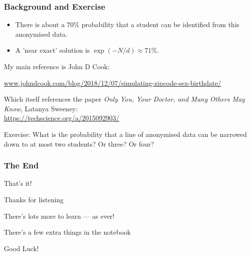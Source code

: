 \documentclass[dvips, %
               xcolor=pst,
               hyperref={colorlinks=false,
               dvips,
               citecolor=magenta,menucolor=cyan,
               bookmarks,bookmarksopen,pdfpagemode=UseThumbs}
              ]{beamer}
\renewcommand{\red}{}
\begin{document}
\begin{frame}[fragile]\frametitle{Background and Exercise}

\begin{itemize}[<+->]

\item There is about a $70\%$ probability that a student can be identified from
this anonymised data.

\item A 'near exact' solution is $\exp(-N/d) \approx 71\%$.

\end{itemize}


My main reference is John D Cook:

\bigskip\pause
{\footnotesize
\url{www.johndcook.com/blog/2018/12/07/simulating-zipcode-sex-birthdate/}}

\bigskip\pause
Which itself references the paper {\red \textit{Only You, Your Doctor, and Many Others May Know},
Latanya Sweeney}:\\
\url{https://techscience.org/a/2015092903/}

\bigskip\pause
\alert{Exercise:} What is the probability that a line of anonymised data can be narrowed down
to at most two students? Or three? Or four?


\end{frame}

\begin{frame}[fragile]\frametitle{The End}

That's it!

\bigskip
Thanks for listening

\bigskip
There's lots more to learn --- as ever!

\bigskip
There's a few extra things in the notebook

\bigskip
Good Luck!

\end{frame}
\end{document}
